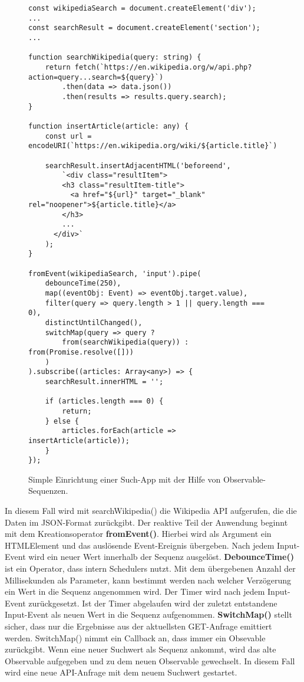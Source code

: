 \begin{figure}[H]
\begin{lstlisting}[basicstyle=\small]
const wikipediaSearch = document.createElement('div');
...
const searchResult = document.createElement('section');
...

function searchWikipedia(query: string) {
    return fetch(`https://en.wikipedia.org/w/api.php?action=query...search=${query}`)
        .then(data => data.json())
        .then(results => results.query.search);
}

function insertArticle(article: any) {
    const url = encodeURI(`https://en.wikipedia.org/wiki/${article.title}`);

    searchResult.insertAdjacentHTML('beforeend',
        `<div class="resultItem">
        <h3 class="resultItem-title">
          <a href="${url}" target="_blank" rel="noopener">${article.title}</a>
        </h3>
        ...
      </div>`
    );
}

fromEvent(wikipediaSearch, 'input').pipe(
    debounceTime(250),
    map((eventObj: Event) => eventObj.target.value),
    filter(query => query.length > 1 || query.length === 0),
    distinctUntilChanged(),
    switchMap(query => query ?
        from(searchWikipedia(query)) : from(Promise.resolve([]))
    )
).subscribe((articles: Array<any>) => {
    searchResult.innerHTML = '';

    if (articles.length === 0) {
        return;
    } else {
        articles.forEach(article => insertArticle(article));
    }
});
\end{lstlisting}
\caption{Simple Einrichtung einer Such-App mit der Hilfe von Observable-Sequenzen.}
\end{figure}

\noindent
In diesem Fall wird mit searchWikipedia() die Wikipedia API aufgerufen, die die Daten im JSON-Format zurückgibt. Der reaktive Teil der Anwendung beginnt mit dem Kreationsoperator \textbf{fromEvent()}. Hierbei wird als Argument ein HTMLElement und das auslösende Event-Ereignis übergeben. Nach jedem Input-Event wird ein neuer Wert innerhalb der Sequenz ausgelöst. \textbf{DebounceTime()} ist ein Operator, dass intern Schedulers nutzt. Mit dem übergebenen Anzahl der Millisekunden als Parameter, kann bestimmt werden nach welcher Verzögerung ein Wert in die Sequenz angenommen wird. Der Timer wird nach jedem Input-Event zurückgesetzt. Ist der Timer abgelaufen wird der zuletzt entstandene Input-Event als neuen Wert in die Sequenz aufgenommen. \textbf{SwitchMap()} stellt sicher, dass nur die Ergebnisse aus der aktuellsten GET-Anfrage emittiert werden. SwitchMap() nimmt ein Callback an, dass immer ein Obsevable zurückgibt. Wenn eine neuer Suchwert als Sequenz ankommt, wird das alte Observable aufgegeben und zu dem neuen Observable gewechselt. In diesem Fall wird eine neue API-Anfrage mit dem neuem Suchwert gestartet.\\

